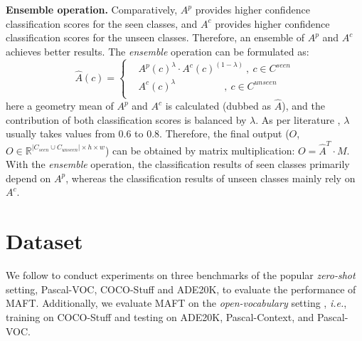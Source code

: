 \noindent \textbf{Ensemble operation.}
Comparatively, $A^p$ provides higher confidence classification scores for the seen classes, and $A^c$ provides higher confidence classification scores for the unseen classes. Therefore, an ensemble of $A^p$ and $A^c$ achieves better results. The \textit{ensemble} operation can be formulated as:
\begin{equation}
\hat{A}(c)=\left\{
\begin{aligned}
&A^p(c)^\lambda \cdot A^c(c)^{(1 - \lambda)}~ , ~c \in C^{seen}\\
&A^c(c)^\lambda ~~~~~~~~~~~~~~~~~~~~~~, ~c \in C^{unseen}\\
\end{aligned}
\right.
\end{equation}
here a geometry mean of $A^p$ and $A^c$ is calculated (dubbed as $\hat{A}$), and the contribution of both classification scores is balanced by $\lambda$. As per literature \cite{zegformer, zsseg, freeseg}, $\lambda$ usually takes values from 0.6 to 0.8. Therefore, the final output ($O$, $O \in \mathbb{R}^{|C_{seen}\cup C_{unseen}| \times h \times w }$) can be obtained by matrix multiplication: $O = \hat{A}^T\cdot M$.
With the \textit{ensemble} operation, the classification results of seen classes primarily depend on $A^p$, whereas the classification results of unseen classes mainly rely on $A^c$.





\section{Dataset}
\label{sec:dataset}   
We follow \cite{zs5, gu2020context, pastore2021closer, zegformer, zsseg} to conduct experiments on three benchmarks of the popular \textit{zero-shot} setting, Pascal-VOC, COCO-Stuff and ADE20K, to evaluate the performance of MAFT. Additionally, we evaluate MAFT on the \textit{open-vocabulary} setting \cite{ovseg, zsseg}, \textit{i.e.}, training on COCO-Stuff and testing on ADE20K, Pascal-Context, and Pascal-VOC. 

